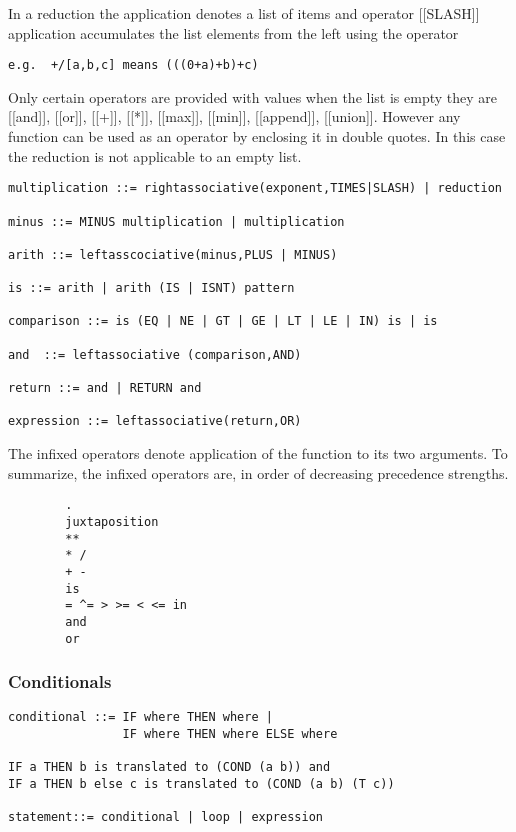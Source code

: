 \documentclass{article}
\begin{document}
In a reduction the application denotes a list of items and
operator [[SLASH]] application accumulates the list elements from the
left using the operator
\begin{verbatim}
e.g.  +/[a,b,c] means (((0+a)+b)+c)
\end{verbatim}

Only certain operators are provided with values when the list is empty
they are [[and]], [[or]], [[+]], [[*]], [[max]], [[min]], [[append]],
[[union]]. However any function can be used as an operator by enclosing it
in double quotes. In this case the reduction is not applicable to an
empty list.
\begin{verbatim}
multiplication ::= rightassociative(exponent,TIMES|SLASH) | reduction

minus ::= MINUS multiplication | multiplication

arith ::= leftasscociative(minus,PLUS | MINUS)

is ::= arith | arith (IS | ISNT) pattern

comparison ::= is (EQ | NE | GT | GE | LT | LE | IN) is | is

and  ::= leftassociative (comparison,AND)

return ::= and | RETURN and

expression ::= leftassociative(return,OR)
\end{verbatim}

The infixed operators denote application of the function to its
two arguments. To summarize,
the infixed operators are, in order of decreasing precedence
strengths.
\begin{verbatim}
        .
        juxtaposition
        **
        * /
        + -
        is
        = ^= > >= < <= in
        and
        or
\end{verbatim}

\subsubsection{Conditionals}
\label{sec:boot:conditional}

\begin{verbatim}
conditional ::= IF where THEN where |
                IF where THEN where ELSE where

IF a THEN b is translated to (COND (a b)) and
IF a THEN b else c is translated to (COND (a b) (T c))

statement::= conditional | loop | expression
\end{verbatim}
\end{document}
